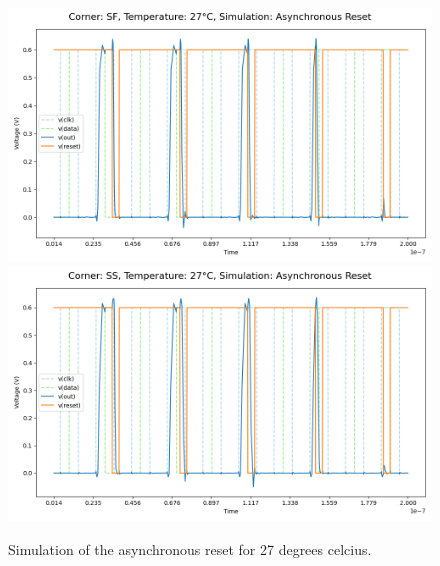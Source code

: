 \begin{figure}[H]
    \vspace{5pt}
    \includegraphics[height= 0.21\textheight]{figures/aimspice/SF/27/W2.csv.png}
    \vspace{5pt}
    \includegraphics[height= 0.21\textheight]{figures/aimspice/SS/27/W2.csv.png}
    \caption{Simulation of the asynchronous reset for 27 degrees celcius.}
    \label{fig:aimspice_W2_27}
\end{figure}

\pagebreak

